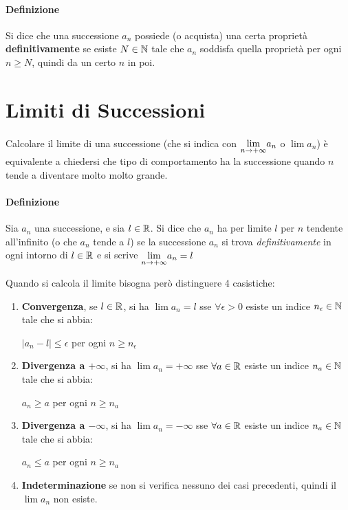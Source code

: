 \documentclass[12pt, a4paper, openany]{book}
\begin{document}
\paragraph*{Definizione} Si dice che una successione {$a_n$} possiede (o acquista) una certa proprietà \textbf{definitivamente} se esiste $N \in \mathbb{N}$ tale che
$a_n$ soddisfa quella proprietà per ogni $n \geq N$, quindi da un certo $n$ in poi.


\section{Limiti di Successioni}
\paragraph*{}Calcolare il limite di una successione (che si indica con $\underset{n \to +\infty}{\lim}a_n$ o $\lim a_n$)
è equivalente a chiedersi che tipo di comportamento ha la successione quando $n$ tende a diventare molto molto grande.

\paragraph*{Definizione} Sia $a_n$ una successione, e sia $l \in \mathbb{R}$.
Si dice che $a_n$ ha per limite $l$ per $n$ tendente all'infinito (o che $a_n$ tende a $l$)
se la successione $a_n$ si trova \emph{definitivamente} in ogni intorno di $l \in \mathbb{R}$
e si scrive $\underset{n \to +\infty}{\lim} a_n = l$

Quando si calcola il limite bisogna però distinguere 4 casistiche:
\begin{enumerate}
	\item \textbf{Convergenza}, se $l\in\mathbb{R}$, si ha $\lim a_n = l$ sse $\forall \epsilon > 0$ esiste un indice $n_\epsilon\in\mathbb{N}$ tale che si abbia:
	      \begin{center}
		      $|a_n-l|\leq\epsilon$ per ogni $n \geq n_\epsilon$
	      \end{center}
	\item \textbf{Divergenza a $+\infty$}, si ha $\lim a_n = +\infty$ sse $\forall a\in \mathbb{R}$ esiste un indice $n_a\in\mathbb{N}$ tale che si abbia:
	      \begin{center}
		      $a_n\geq a$ per ogni $n \geq n_a$
	      \end{center}
	\item \textbf{Divergenza a $-\infty$}, si ha $\lim a_n = -\infty$ sse $\forall a\in \mathbb{R}$ esiste un indice $n_a\in\mathbb{N}$ tale che si abbia:
	      \begin{center}
		      $a_n\leq a$ per ogni $n \geq n_a$
	      \end{center}
	\item \textbf{Indeterminazione} se non si verifica nessuno dei casi precedenti, quindi il $\lim a_n$ non esiste.
\end{enumerate}
\end{document}
